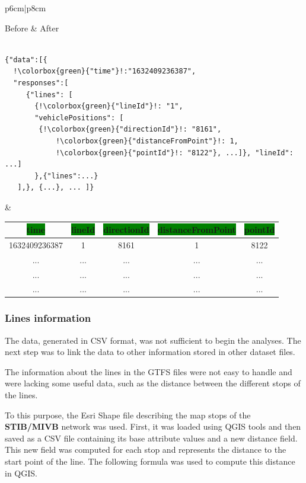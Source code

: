 \documentclass{article}
\begin{document}
\begin{tabular}{p{6cm}|p{8cm}}

\hspace{2cm} Before & \hspace{5cm} After \\

\begin{lstlisting}[frame=none, escapechar=!]

{"data":[{
  !\colorbox{green}{"time"}!:"1632409236387",
  "responses":[
     {"lines": [
       {!\colorbox{green}{"lineId"}!: "1",
       "vehiclePositions": [
	    {!\colorbox{green}{"directionId"}!: "8161",
            !\colorbox{green}{"distanceFromPoint"}!: 1,
            !\colorbox{green}{"pointId"}!: "8122"}, ...]}, "lineId": ...]
       },{"lines":...}
   ],}, {...}, ... ]}

\end{lstlisting}

&
\vspace{2cm}
\begin{center}
\begin{tabular}{|c|c|c|c|c|} 
 \hline
 \colorbox{green}{time} & \colorbox{green}{lineId} &\colorbox{green}{directionId} & \colorbox{green}{distanceFromPoint} &  \colorbox{green}{pointId}\\ [0.5ex] 
 \hline\hline
 1632409236387 & 1 & 8161 & 1 & 8122 \\ 
 \hline
 ... & ... & ... & ... & ... \\
 \hline
 ... & ... & ... & ... & ... \\
 \hline
 ... & ... & ... & ... & ... \\
 \hline
\end{tabular}
\end{center}

\end{tabular}

\subsubsection{Lines information}

The data, generated in CSV format, was not sufficient to begin the analyses. The next step was to link the data to other information stored in other dataset files.

The information about the lines in the GTFS files were not easy to handle and were lacking some useful data, such as the distance between the different stops of the lines.

To this purpose, the Esri Shape file describing the map stops of the \textbf{STIB/MIVB} network was used. First, it was loaded using QGIS tools and then saved as a CSV file containing its base attribute values and a new distance field. This new field was computed for each stop and represents the distance to the start point of the line. The following formula was used to compute this distance in QGIS.
\end{document}
